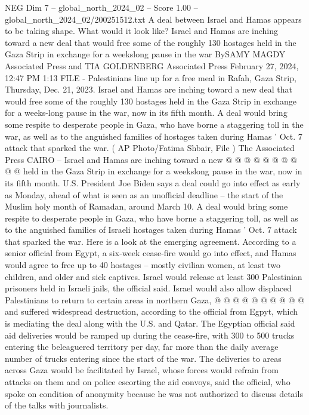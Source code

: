 \begin{textsample}{NEG Dim 7 – global\_north\_2024\_02 – Score 1.00 – global\_north\_2024\_02/200251512.txt}  \label{ex:f7_neg_435}
A deal between Israel and Hamas appears to be taking shape.
What would it look like?
Israel and Hamas are inching toward a new deal that would free some of the roughly 130 hostages held in the Gaza Strip in exchange for a weekslong pause in the war BySAMY MAGDY Associated Press and TIA GOLDENBERG Associated Press February 27, 2024, 12:47 PM 1:13 FILE - Palestinians line up for a free meal in Rafah, Gaza Strip, Thursday, Dec. 21, 2023.
Israel and Hamas are inching toward a new deal that would free some of the roughly 130 hostages held in the Gaza Strip in exchange for a weeks-long pause in the war, now in its fifth month.
A deal would bring some respite to desperate people in Gaza, who have borne a staggering toll in the war, as well as to the anguished families of hostages taken during Hamas ' Oct. 7 attack that sparked the war. ( AP Photo/Fatima Shbair, File ) The Associated Press CAIRO -- Israel and Hamas are inching toward a new @ @ @ @ @ @ @ @ @ @ held in the Gaza Strip in exchange for a weekslong pause in the war, now in its fifth month.
U.S.
President Joe Biden says a deal could go into effect as early as Monday, ahead of what is seen as an unofficial deadline -- the start of the Muslim holy month of Ramadan, around March 10.
A deal would bring some respite to desperate people in Gaza, who have borne a staggering toll, as well as to the anguished families of Israeli hostages taken during Hamas ' Oct. 7 attack that sparked the war.
Here is a look at the emerging agreement.
According to a senior official from Egypt, a six-week cease-fire would go into effect, and Hamas would agree to free up to 40 hostages -- mostly civilian women, at least two children, and older and sick captives.
Israel would release at least 300 Palestinian prisoners held in Israeli jails, the official said.
Israel would also allow displaced Palestinians to return to certain areas in northern Gaza, @ @ @ @ @ @ @ @ @ @ and suffered widespread destruction, according to the official from Egpyt, which is mediating the deal along with the U.S. and Qatar.
The Egyptian official said aid deliveries would be ramped up during the cease-fire, with 300 to 500 trucks entering the beleaguered territory per day, far more than the daily average number of trucks entering since the start of the war.
The deliveries to areas across Gaza would be facilitated by Israel, whose forces would refrain from attacks on them and on police escorting the aid convoys, said the official, who spoke on condition of anonymity because he was not authorized to discuss details of the talks with journalists.

\end{textsample}
